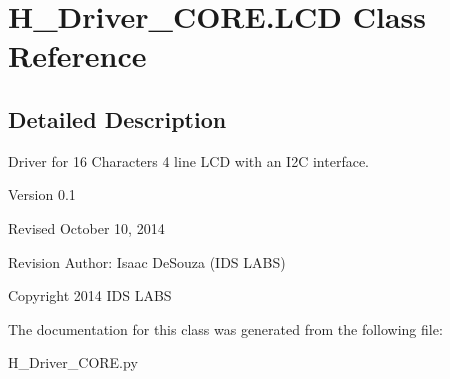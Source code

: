 \hypertarget{classH__Driver__CORE_1_1LCD}{}\section{H\+\_\+\+Driver\+\_\+\+C\+O\+R\+E.\+L\+C\+D Class Reference}
\label{classH__Driver__CORE_1_1LCD}


\subsection{Detailed Description}
\begin{DoxyVerb}Driver for 16 Characters 4 line LCD with an I2C interface.

Version 0.1

Revised October 10, 2014

Revision Author: Isaac DeSouza (IDS LABS)

Copyright 2014 IDS LABS
\end{DoxyVerb}
 

The documentation for this class was generated from the following file\+:\begin{DoxyCompactItemize}
\item 
H\+\_\+\+Driver\+\_\+\+C\+O\+R\+E.\+py\end{DoxyCompactItemize}
